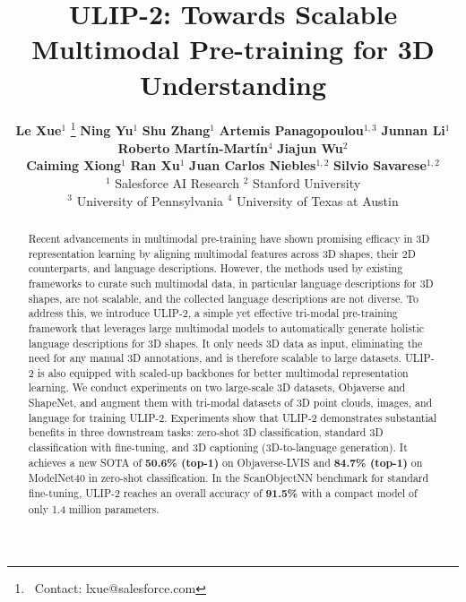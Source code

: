\documentclass[10pt,twocolumn,letterpaper]{article}
\title{ULIP-2: Towards Scalable Multimodal Pre-training for 3D Understanding}
\author{%
\textbf{Le Xue$^{1}$} \thanks{\ Contact: lxue@salesforce.com}
\hspace*{0.5em}
\textbf{Ning Yu$^{1}$} \hspace*{0.5em}
\textbf{Shu Zhang$^{1}$} \hspace*{0.5em}
\textbf{Artemis Panagopoulou$^{1,3}$} \hspace*{0.5em}
\textbf{Junnan Li$^{1}$} \hspace*{0.5em} \\
\textbf{Roberto Martín-Martín$^{4}$} \hspace*{0.5em}
\textbf{Jiajun Wu$^{2}$} \hspace*{0.5em} \\
\textbf{Caiming Xiong$^{1}$} \hspace*{0.5em}
\textbf{Ran Xu$^{1}$} \hspace*{0.5em}
\textbf{Juan Carlos Niebles$^{1,2}$} \hspace*{0.5em}
\textbf{Silvio Savarese$^{1, 2}$}
\\
$^{1}$ Salesforce AI Research \hspace*{0.1em} $^{2}$ Stanford University \hspace*{0.1em} \\
$^{3}$ University of Pennsylvania  \hspace*{0.1em} ${^4}$ University of Texas at Austin
}
\begin{document}
\newcommand{\customsize}{\fontsize{5}{8}\selectfont}

\newcommand{\customsizePointnext}{\fontsize{8}{11}\selectfont}

\newcommand{\customsizeTripletstats}{\fontsize{6}{9}\selectfont}



\maketitle


\begin{abstract}
\vspace{-2mm}
Recent advancements in multimodal pre-training have shown promising efficacy in 3D representation learning by aligning multimodal features across 3D shapes, their 2D counterparts, and language descriptions.
However, the methods used by existing frameworks to curate such multimodal data, in particular language descriptions for 3D shapes, are not scalable, and the collected language descriptions are not diverse. %
To address this, we introduce ULIP-2, a simple yet effective tri-modal pre-training framework that leverages large multimodal models to automatically generate holistic language descriptions for 3D shapes. It only needs 3D data as input, eliminating the need for any manual 3D annotations, and is therefore scalable to large datasets.
ULIP-2 is also equipped with scaled-up backbones for better multimodal representation learning.
We conduct experiments on two large-scale 3D datasets, Objaverse and ShapeNet, and augment them with tri-modal datasets of 3D point clouds, images, and language for training ULIP-2.
Experiments show that ULIP-2 demonstrates substantial benefits in three downstream tasks: zero-shot 3D classification, standard 3D classification with fine-tuning, and 3D captioning (3D-to-language generation).
It achieves a new SOTA of \textbf{50.6\% (top-1)} on Objaverse-LVIS and \textbf{84.7\% (top-1)} on ModelNet40 in zero-shot classification. In the ScanObjectNN benchmark for standard fine-tuning, ULIP-2 reaches an overall accuracy of \textbf{91.5\%} with a compact model of only 1.4 million parameters.

\end{abstract}
\end{document}
